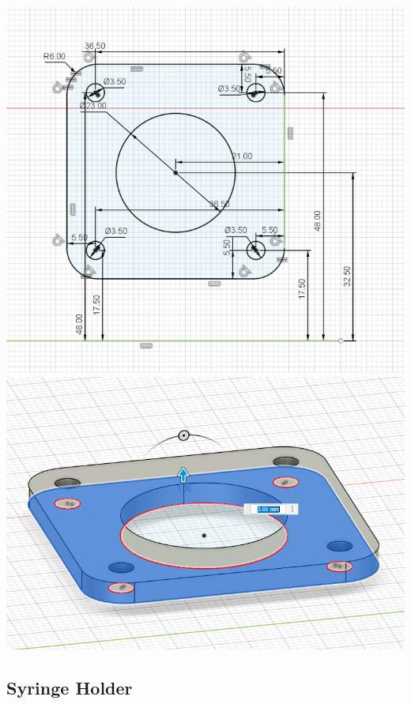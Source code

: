\includegraphics[width=\textwidth]{3dprints/motor_holder.png}
\includegraphics[width=\textwidth]{3dprints/motor_holder_2.png}

\subsection{Syringe Holder}

